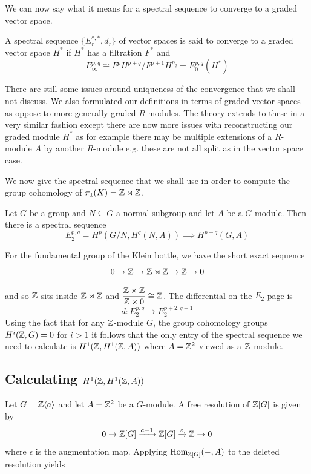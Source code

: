 We can now say what it means for a spectral sequence to converge to a graded
vector space.

\begin{definition}
    A spectral sequence $\{E_r^{*,*}, d_r\}$ of vector spaces is said to converge to a graded vector space $H^*$ if $H^*$ has a filtration
    $F^*$ and
    $$
        E_{\infty}^{p,q} \cong F^pH^{p+q}/F^{p+1}H^{p_q} = E_0^{p,q}(H^*)
    $$
\end{definition}

There are still some issues around uniqueness of the convergence that we shall
not discuss. We also formulated our definitions in terms of graded vector
spaces as oppose to more generally graded $R$-modules. The theory extends to
these in a very similar fashion except there are now more issues with
reconstructing our graded module $H^*$ as for example there may be multiple
extensions of a $R$-module $A$ by another $R$-module e.g. these are not all
split as in the vector space case.

We now give the spectral sequence that we shall use in order to compute the
group cohomology of $\pi_1(K) = \mathbb{Z} \rtimes \mathbb{Z}$.

\begin{lemma}
    Let $G$ be a group and $N \subseteq G$ a normal subgroup and let $A$ be a $G$-module. Then there is a spectral sequence
    $$
        E_2^{p,q} = H^p(G/N, H^q(N, A)) \implies H^{p+q}(G, A)
    $$
\end{lemma}

For the fundamental group of the Klein bottle, we have the short exact sequence
$$ 0 \to \mathbb{Z} \to \mathbb{Z} \rtimes \mathbb{Z} \to \mathbb{Z} \to 0 $$

and so $\mathbb{Z}$ sits inside $\mathbb{Z} \rtimes \mathbb{Z}$ and $\dfrac{\mathbb{Z} \rtimes \mathbb{Z}}{\mathbb{Z} \times 0}
    \cong \mathbb{Z}$. The differential on the $E_2$ page is $$ d: E_2^{p,q} \to E_2^{p+2,
    q-1} $$ Using the fact that for any $\mathbb{Z}$-module $G$, the group cohomology
groups $H^i(\mathbb{Z}, G)=0$ for $i>1$ it follows that the only entry of the spectral
sequence we need to calculate is $H^1(\mathbb{Z}, H^1(\mathbb{Z}, A))$ where $A= \mathbb{Z}^2$ viewed
as a $\mathbb{Z}$-module.

\subsection{Calculating $H^1(\mathbb{Z}, H^1(\mathbb{Z}, A))$ }

Let $G=\mathbb{Z}\langle a \rangle$ and let $A=\mathbb{Z}^2$ be a $G$-module. A free resolution
of $\mathbb{Z}[G]$ is given by $$ 0 \to \mathbb{Z}[G] \xrightarrow{a-1} \mathbb{Z}[G]
    \xrightarrow{\varepsilon} \mathbb{Z} \to 0 $$ where $\epsilon$ is the augmentation map.
Applying $\text{Hom}_{\mathbb{Z}[G]}(-, A)$ to the deleted resolution yields

